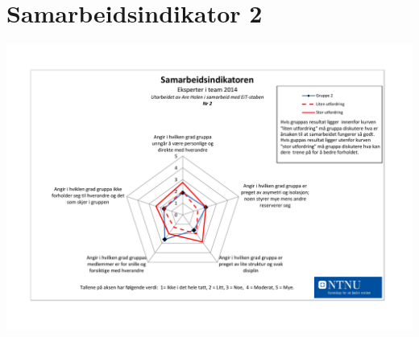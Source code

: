 \section{Samarbeidsindikator 2}
\label{appendix:samarbeidsindikator2}
\begin{center}
\includegraphics[clip=true, width=1 \textwidth,
trim=0cm 0cm 0cm 0cm]{Samarbeidsindikator2.pdf}
\label{fig:indikator1}
\end{center}
